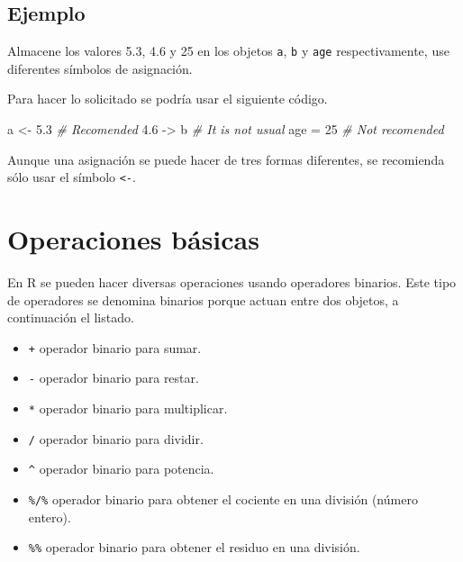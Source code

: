 \documentclass[10pt,]{krantz}
\makeatletter
\newenvironment{Shaded}{\begin{snugshade}}{\end{snugshade}}
\newcommand{\DecValTok}[1]{\textcolor[rgb]{0.00,0.00,0.81}{{#1}}}
\newcommand{\FloatTok}[1]{\textcolor[rgb]{0.00,0.00,0.81}{{#1}}}
\newcommand{\StringTok}[1]{\textcolor[rgb]{0.31,0.60,0.02}{{#1}}}
\newcommand{\CommentTok}[1]{\textcolor[rgb]{0.56,0.35,0.01}{\textit{{#1}}}}
\newcommand{\NormalTok}[1]{{#1}}
\providecommand{\tightlist}{%
  \setlength{\itemsep}{0pt}\setlength{\parskip}{0pt}}
\let\proglang=\textsf
\newenvironment{kframe}{%
\medskip{}
\setlength{\fboxsep}{.8em}
 \def\at@end@of@kframe{}%
 \ifinner\ifhmode%
  \def\at@end@of@kframe{\end{minipage}}%
  \begin{minipage}{\columnwidth}%
 \fi\fi%
 \def\FrameCommand##1{\hskip\@totalleftmargin \hskip-\fboxsep
 \colorbox{shadecolor}{##1}\hskip-\fboxsep
     \hskip-\linewidth \hskip-\@totalleftmargin \hskip\columnwidth}%
 \MakeFramed {\advance\hsize-\width
   \@totalleftmargin\z@ \linewidth\hsize
   \@setminipage}}%
 {\par\unskip\endMakeFramed%
 \at@end@of@kframe}
\renewenvironment{Shaded}{\begin{kframe}}{\end{kframe}}
\let\BeginKnitrBlock\begin \let\EndKnitrBlock\end
\makeatother
\begin{document}
\subsection*{Ejemplo}\label{ejemplo}


Almacene los valores 5.3, 4.6 y 25 en los objetos \texttt{a}, \texttt{b}
y \texttt{age} respectivamente, use diferentes símbolos de asignación.

Para hacer lo solicitado se podría usar el siguiente código.

\begin{Shaded}
\begin{Highlighting}[]
\NormalTok{a <-}\StringTok{ }\FloatTok{5.3} \CommentTok{# Recomended}
\FloatTok{4.6} \NormalTok{->}\StringTok{ }\NormalTok{b }\CommentTok{# It is not usual}
\NormalTok{age =}\StringTok{ }\DecValTok{25} \CommentTok{# Not recomended}
\end{Highlighting}
\end{Shaded}

\BeginKnitrBlock{rmdimportant}
Aunque una asignación se puede hacer de tres formas diferentes, se
recomienda sólo usar el símbolo \texttt{\textless{}-}.
\EndKnitrBlock{rmdimportant}

\section{\texorpdfstring{Operaciones básicas
}{Operaciones básicas }}\label{operaciones-basicas}

En \proglang{R} se pueden hacer diversas operaciones usando operadores
binarios. Este tipo de operadores se denomina binarios porque actuan
entre dos objetos, a continuación el listado.

\begin{itemize}
\tightlist
\item
  \texttt{+} operador binario para sumar.
\item
  \texttt{-} operador binario para restar.
\item
  \texttt{*} operador binario para multiplicar.
\item
  \texttt{/} operador binario para dividir.
\item
  \texttt{\^{}} operador binario para potencia.
\item
  \texttt{\%/\%} operador binario para obtener el cociente en una
  división (número entero).
\item
  \texttt{\%\%} operador binario para obtener el residuo en una
  división.
\end{itemize}
\end{document}
